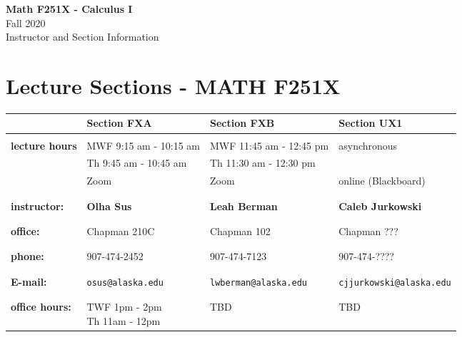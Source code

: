 \documentclass[11pt,fleqn]{article}
\begin{document}
\setcounter{secnumdepth}{0}

\vspace*{-1in}
\begin{center}
\large{\textbf{Math F251X - Calculus I}}\\

\large{Fall 2020\\ Instructor and Section Information}
\end{center}

\vfill

\section{Lecture Sections - MATH F251X}

\begin{tabular}{| l || l | l | l |}
\hline \hline
&Section FXA&Section FXB&Section UX1\\
\hline \hline
&&&\\
\textbf{lecture hours}&MWF 9:15 am - 10:15 am&MWF 11:45 am - 12:45 pm& 
asynchronous\\
&Th 9:45 am - 10:45 am& Th 11:30 am - 12:30 pm & \\
&Zoom & Zoom &  online (Blackboard)\\
&&&\\
\hline
&&&\\
\textbf{instructor:}&\textbf{Olha Sus}&\textbf{Leah Berman}&\textbf{Caleb Jurkowski}\\
&&&\\
\hline
&&&\\
\textbf{office:}&Chapman 210C&Chapman 102& Chapman ???\\
&&&\\
\hline
&&&\\
\textbf{phone:}&907-474-2452&907-474-7123&907-474-????\\ 
&&&\\\hline
&&&\\
\textbf{E-mail:}&\texttt{osus@alaska.edu} &\texttt{lwberman@alaska.edu} &\texttt{cjjurkowski@alaska.edu}\\ &&&\\ \hline
&&&\\ \textbf{office hours:}&\parbox{5 cm}{TWF 1pm - 2pm\\Th 11am - 12pm} &TBD&TBD\\ 
 \hline
\end{tabular}

\vfill
\end{document}
